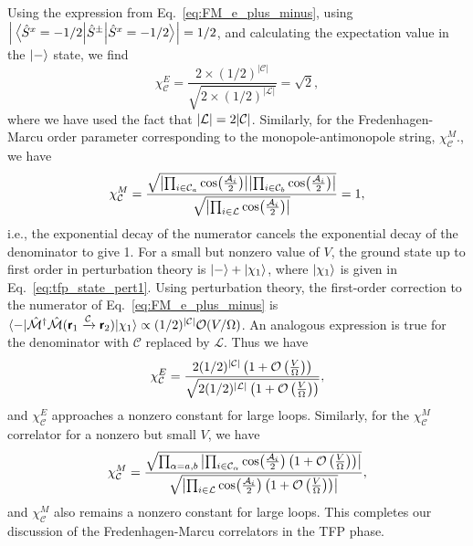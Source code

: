 \documentclass[twocolumn,superscriptaddress,amsmath,amssymb,aps,prx,nofootinbib]{revtex4-2}
\newcommand{\dual}[1]{\boldsymbol{\mathsf{#1}}}
\begin{document}
Using the expression from Eq.~\eqref{eq:FM_e_plus_minus}, using $\abs{ \expval{ \hat{S}^{\pm}   }{\hat{S}^x = -1/2} } = 1/2$, and calculating the expectation value in the $\ket{-}$ state, we find 
\begin{equation}
    \chi_\mathcal{C}^E = \frac{2 \times (1/2)^{|\mathcal{C}|}}{\sqrt{ 2 \times (1/2)^{|\mathcal{L}|} }} = \sqrt{2},
\end{equation}
where we have used the fact that $\abs{\mathcal{L}} = 2 \abs{\mathcal{C}}$. Similarly, for the Fredenhagen-Marcu order parameter corresponding to the monopole-antimonopole string, $\chi_\mathcal{C}^M$., we have
\begin{equation}
    \chi_\mathcal{C}^M = \frac{\sqrt{\abs{\prod_{i \in \mathcal{C}_a} \cos(\frac{\mathcal{A}_i}{2})}\abs{\prod_{i \in \mathcal{C}_b} \cos(\frac{\mathcal{A}_i}{2})}   }}{\sqrt{\abs{\prod_{i \in \mathcal{L}} \cos(\frac{\mathcal{A}_i}{2}) } }}=1,
\end{equation}
i.e., the exponential decay of the numerator cancels the exponential decay of the denominator to give 1. 
For a small but nonzero value of $V$, the ground state up to first order in perturbation theory is $\ket{-} + \ket{\chi_1}$, where $\ket{\chi_1}$ is given in Eq.~\eqref{eq:tfp_state_pert1}. Using perturbation theory, the first-order correction to the numerator of Eq.~\eqref{eq:FM_e_plus_minus} is $\langle - | \hat{\mathcal{M}}^\dagger \hat{\mathcal{M}} (\dual{r}_1 \xrightarrow{\mathcal{C}} \dual{r}_2) | \chi_1 \rangle \propto (1/2)^{\abs{\mathcal{C}}} \mathcal{O} (V/\Omega)$. An analogous expression is true for the denominator with $\mathcal{C}$ replaced by $\mathcal{L}$. Thus we have
\begin{equation}
    \chi_\mathcal{C}^E = \frac{ 2 (1/2)^{\abs{\mathcal{C}}} \left( 1+\mathcal{O} \left( \frac{V}{\Omega} \right)\right)}{\sqrt{2 (1/2)^{\abs{\mathcal{L}}} \left( 1+\mathcal{O} \left( \frac{V}{\Omega} \right)\right)}},
\end{equation}
and $\chi_\mathcal{C}^E$ approaches a nonzero constant for large loops. Similarly, for the $\chi_\mathcal{C}^M$ correlator for a nonzero  but small $V$, we have
\begin{equation}
    \chi_\mathcal{C}^M = \frac{\sqrt{\prod_{\alpha=a,b}\abs{\prod_{i \in \mathcal{C}_\alpha} \cos(\frac{\mathcal{A}_i}{2}) \left(1+ \mathcal{O} \left(\frac{V}{\Omega} \right) \right) }  }}{\sqrt{\abs{\prod_{i \in \mathcal{L}} \cos(\frac{\mathcal{A}_i}{2})\left(1+ \mathcal{O} \left(\frac{V}{\Omega} \right) \right) } }}, 
\end{equation}
and $\chi_\mathcal{C}^M$ also remains a nonzero constant for large loops. This completes our discussion of the Fredenhagen-Marcu correlators in the TFP phase.
\end{document}
